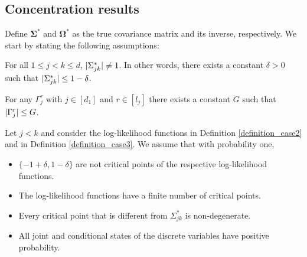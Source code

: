 \subsection{Concentration results}\label{sec::convergence_results}

Define \(\mathbf{\Sigma}^*\) and \(\mathbf{\Omega}^*\) as the true covariance matrix and its inverse, respectively. We start by stating the following assumptions:

\begin{assumption}\label{ass1}
    For all $1 \leq j < k \leq d$, $\lvert\Sigma_{jk}^*\rvert \neq 1$. In other words, there exists a constant $\delta > 0$ such that $\lvert\Sigma_{jk}^*\rvert \leq 1 - \delta$.
\end{assumption}

\begin{assumption}\label{ass2}
    For any $\Gamma_j^r$ with $j \in [d_1]$ and $r \in [l_{j}]$ there exists a constant $G$ such that $\lvert\Gamma_j^r\rvert \leq G$.
\end{assumption}

\begin{assumption}\label{ass3}
    Let $j < k$ and consider the log-likelihood functions in Definition \ref{definition_case2} and in Definition \ref{definition_case3}. We assume that with probability one,
    \begin{itemize}
        \item $\{-1+\delta, 1 - \delta\}$ are not critical points of the respective log-likelihood functions.
        \item The log-likelihood functions have a finite number of critical points.
        \item Every critical point that is different from $\Sigma_{jk}^*$ is non-degenerate.
        \item All joint and conditional states of the discrete variables have positive probability.
    \end{itemize}
\end{assumption}


